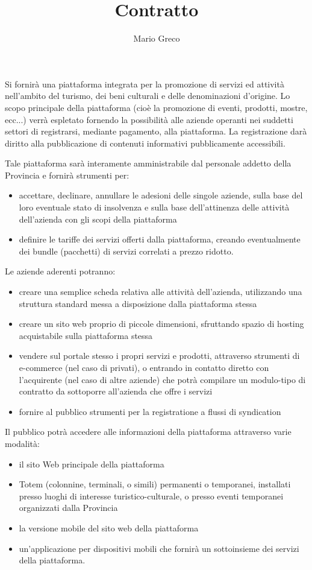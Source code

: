 \documentclass[12pt,a4paper]{article}
\title{Contratto}
\author{Mario Greco}
\begin{document}
  \maketitle

Si fornirà una piattaforma integrata per la promozione di servizi ed attività nell'ambito del turismo, dei beni culturali e delle denominazioni d'origine.
Lo scopo principale della piattaforma (cioè la promozione di eventi, prodotti, mostre, ecc...) verrà espletato fornendo la possibilità alle aziende operanti nei suddetti settori di registrarsi, mediante pagamento, alla piattaforma. La registrazione darà diritto alla pubblicazione di contenuti informativi pubblicamente accessibili.

Tale piattaforma sarà interamente amministrabile dal personale addetto della Provincia e fornirà strumenti per:
\begin{itemize}
 \item accettare, declinare, annullare le adesioni delle singole aziende, sulla base del loro eventuale stato di insolvenza e sulla base dell'attinenza delle attività dell'azienda con gli scopi della piattaforma
 \item definire le tariffe dei servizi offerti dalla piattaforma, creando eventualmente dei bundle (pacchetti) di servizi correlati a prezzo ridotto.
\end{itemize}

Le aziende aderenti potranno:
\begin{itemize}
 \item creare una semplice scheda relativa alle attività dell'azienda, utilizzando una struttura standard messa a disposizione dalla piattaforma stessa
 \item creare un sito web proprio di piccole dimensioni, sfruttando spazio di hosting acquistabile sulla piattaforma stessa
 \item vendere sul portale stesso i propri servizi e prodotti, attraverso strumenti di e-commerce (nel caso di privati), o entrando in contatto diretto con l'acquirente (nel caso di altre aziende) che potrà compilare un modulo-tipo di contratto da sottoporre all'azienda che offre i servizi
 \item fornire al pubblico strumenti per la registratione a flussi di syndication
\end{itemize}

Il pubblico potrà accedere alle informazioni della piattaforma attraverso varie modalità:
\begin{itemize}
 \item il sito Web principale della piattaforma
 \item Totem (colonnine, terminali, o simili) permanenti o temporanei, installati presso luoghi di interesse turistico-culturale, o presso eventi temporanei organizzati dalla Provincia
 \item la versione mobile del sito web della piattaforma
 \item un'applicazione per dispositivi mobili che fornirà un sottoinsieme dei servizi della piattaforma.
\end{itemize}
\end{document}
